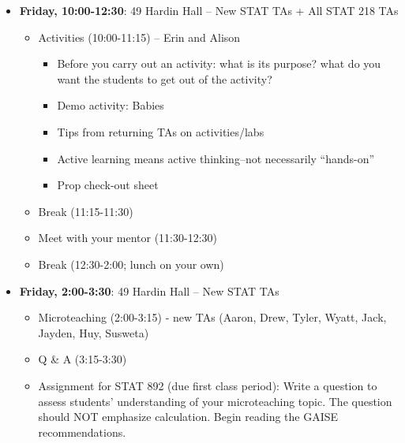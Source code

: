 \documentclass{article}
\begin{document}
\begin{itemize}
\item \textbf{Friday, 10:00-12:30}: 49 Hardin Hall -- New STAT TAs + All STAT 218 TAs
\begin{itemize}
\item Activities (10:00-11:15) -- Erin and Alison
\begin{itemize}
\item Before you carry out an activity:  what is its purpose?  what do you want the students to get out of the activity?  
\item Demo activity: Babies
\item Tips from returning TAs on activities/labs
\item Active learning means active thinking--not necessarily ``hands-on''
\item Prop check-out sheet
\end{itemize}
\item Break (11:15-11:30)
\item Meet with your mentor (11:30-12:30)
\item Break (12:30-2:00; lunch on your own)
\end{itemize}

\item \textbf{Friday, 2:00-3:30}: 49 Hardin Hall -- New STAT TAs
\begin{itemize}
\item Microteaching (2:00-3:15) -  new TAs (Aaron, Drew, Tyler, Wyatt, Jack, Jayden, Huy, Susweta)
\item Q \& A (3:15-3:30)
\item Assignment for STAT 892 (due first class period):  Write a question to assess students' understanding of your microteaching topic. The question should NOT emphasize calculation. Begin reading the GAISE recommendations.
\end{itemize}

\end{itemize}
\end{document}
